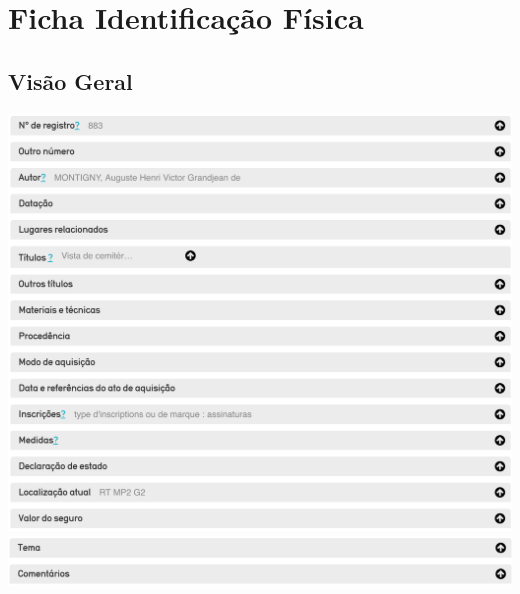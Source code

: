 
\lstset{language=XML}


\section{Ficha Identificação Física}
\subsection{Visão Geral}
\begin{flushleft}
	\includegraphics[width=\linewidth]{fichaId-01}
	\includegraphics[width=\linewidth]{fichaId-02}
\end{flushleft}
%	
